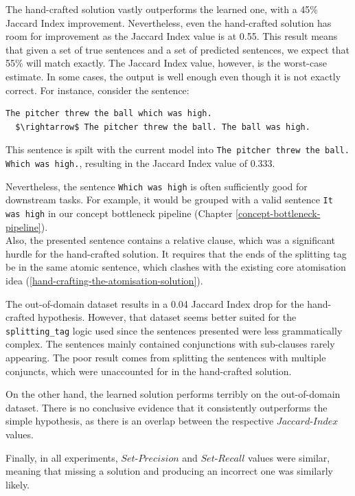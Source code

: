 The hand-crafted solution vastly outperforms the learned one, with a 45\% Jaccard Index improvement.
Nevertheless, even the hand-crafted solution has room for improvement as the Jaccard Index value is at 0.55.
This result means that given a set of true sentences and a set of predicted sentences, we expect that 55\% will match exactly.
The Jaccard Index value, however, is the worst-case estimate.
In some cases, the output is well enough even though it is not exactly correct.
For instance, consider the sentence:
\begin{lstlisting}
The pitcher threw the ball which was high. 
  $\rightarrow$ The pitcher threw the ball. The ball was high.
\end{lstlisting}
This sentence is spilt with the current model into \verb+The pitcher threw the ball.+ \verb+Which was high.+, resulting in the Jaccard Index value of 0.333.

Nevertheless, the sentence \verb+Which was high+ is often sufficiently good for downstream tasks.
For example, it would be grouped with a valid sentence \verb+It was high+ in our concept bottleneck pipeline (Chapter \ref{concept-bottleneck-pipeline}). \\
Also, the presented sentence contains a relative clause, which was a significant hurdle for the hand-crafted solution.
It requires that the ends of the splitting tag be in the same atomic sentence, which clashes with the existing core atomisation idea (\ref{hand-crafting-the-atomisation-solution}).


The out-of-domain dataset results in a 0.04 Jaccard Index drop for the hand-crafted hypothesis.
However, that dataset seems better suited for the \verb+splitting_tag+ logic used since the sentences presented were less grammatically complex.
The sentences mainly contained conjunctions with sub-clauses rarely appearing.
The poor result comes from splitting the sentences with multiple conjuncts, which were unaccounted for in the hand-crafted solution.

On the other hand, the learned solution performs terribly on the out-of-domain dataset.
There is no conclusive evidence that it consistently outperforms the simple hypothesis, as there is an overlap between the respective $Jaccard$-$Index$ values.

Finally, in all experiments, $Set$-$Precision$ and $Set$-$Recall$ values were similar, meaning that missing a solution and producing an incorrect one was similarly likely.

